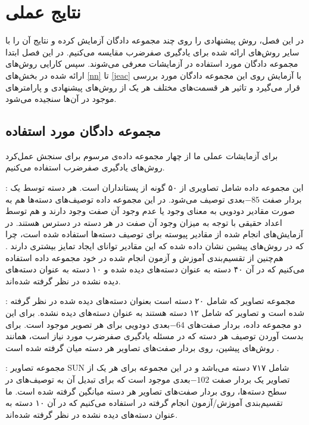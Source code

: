 \chapter{نتایج عملی} \label{chap:experiments}
در این فصل، روش پیشنهادی را روی چند مجموعه دادگان آزمایش کرده و نتایج آن را با سایر روش‌های ارائه شده برای یادگیری صفرضرب مقایسه می‌کنیم. در این فصل ابتدا مجموعه دادگان مورد استفاده در آزمایشات معرفی می‌شوند. سپس کارایی روش‌های ارائه شده در بخش‌های
\ref{nn}
تا
\ref{jeac}
با آزمایش روی این مجموعه دادگان مورد بررسی قرار می‌گیرد و تاثیر هر قسمت‌های مختلف هر یک از روش‌های پیشنهادی و پارامترهای موجود در آن‌ها سنجیده می‌شود.


\section{مجموعه دادگان مورد استفاده}\label{exp:datasets}
برای آزمایشات عملی ما از چهار مجموعه داده‌ی مرسوم برای سنجش عمل‌کرد روش‌های یادگیری صفرضرب استفاده می‌کنیم.

\textbf{} \cite{lampert09}:
این مجموعه داده شامل تصاویری از ۵۰ گونه از پستانداران است. هر دسته توسط یک بردار صفت $-85$بعدی توصیف می‌شود. در این مجموعه داده توصیف‌های دسته‌ها هم به صورت مقادیر دودویی به معنای وجود یا عدم وجود آن صفت وجود دارند و هم توسط اعداد حقیقی با توجه به میزان وجود آن صفت در هر دسته در دسترس هستند. در آزمایش‌های انجام شده از مقادیر پیوسته برای توصیف دسته‌ها استفاده شده است، چرا که در روش‌های پیشین نشان داده شده که این مقادیر توانای ایجاد تمایز بیشتری دارند \cite{Akata2015}. هم‌چنین از تقسیم‌بندی آموزش و آزمون انجام شده در خود مجموعه داده استفاده می‌کنیم که در آن ۴۰ دسته به عنوان دسته‌های دیده شده و ۱۰ دسته به عنوان
دسته‌های دیده نشده در نظر گرفته شده‌اند.

\textbf{}\cite{farhadi09}:
مجموعه تصاویر
  \cite{pascal}
 که شامل ۲۰ دسته است بعنوان دسته‌های دیده شده در نظر گرفته شده است و تصاویر  که شامل ۱۲ دسته هستند به عنوان دسته‌های دیده نشده. برای این دو مجموعه داده، بردار صفت‌های $-64$بعدی دودویی برای هر تصویر موجود است. برای بدست آوردن توصیف هر دسته که در مسئله یادگیری صفرضرب مورد نیاز است، همانند روش‌های پیشین، روی بردار صفت‌های تصاویر هر دسته میان گرفته
 شده است  \cite{lampert09}.


\textbf{} \cite{sun}:
مجموعه تصاویر SUN شامل ۷۱۷ دسته می‌باشد و در این مجموعه برای هر یک از تصاویر یک بردار صفت $-102$بعدی موجود است که برای تبدیل آن به توصیف‌های در سطح دسته‌ها، روی بردار صفت‌های تصاویر هر دسته میانگین گرفته شده است. ما تقسیم‌بندی آموزش/آزمون انجام گرفته در \cite{jayaraman14} استفاده می‌کنیم که در آن ۱۰ دسته به عنوان دسته‌های دیده نشده در نظر گرفته شده‌اند.

